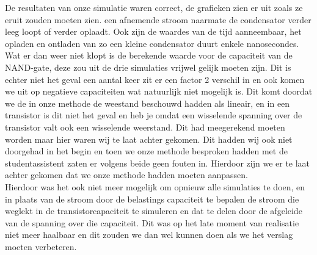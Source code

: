 \documentclass{article}
\begin{document}
De resultaten van onze simulatie waren correct, de grafieken zien er uit zoals ze eruit zouden moeten zien. een afnemende stroom naarmate de condensator verder leeg loopt of verder oplaadt. Ook zijn de waardes van de tijd aanneembaar, het opladen en ontladen van zo een kleine condensator duurt enkele nanosecondes.\\
Wat er dan weer niet klopt is de berekende waarde voor de capaciteit van de NAND-gate, deze zou uit de drie simulaties vrijwel gelijk moeten zijn. Dit is echter niet het geval een aantal keer zit er een factor 2 verschil in en ook komen we uit op negatieve capaciteiten wat natuurlijk niet mogelijk is. Dit komt doordat we de in onze methode de weestand beschouwd hadden als lineair, en in een transistor is dit niet het geval en heb je omdat een wisselende spanning over de transistor valt ook een wisselende weerstand. Dit had meegerekend moeten worden maar hier waren wij te laat achter gekomen. Dit hadden wij ook niet doorgehad in het begin en toen we onze methode besproken hadden met de studentassistent zaten er volgens beide geen fouten in. Hierdoor zijn we er te laat achter gekomen dat we onze methode hadden moeten aanpassen.\\
Hierdoor was het ook niet meer mogelijk om opnieuw alle simulaties te doen, en in plaats van de stroom door de belastings capaciteit te bepalen de stroom die weglekt in de transistorcapaciteit te simuleren en dat te delen door de afgeleide van de spanning over die capaciteit. Dit was op het late moment van realisatie niet meer haalbaar en dit zouden we dan wel kunnen doen als we het verslag moeten verbeteren.
\end{document}

